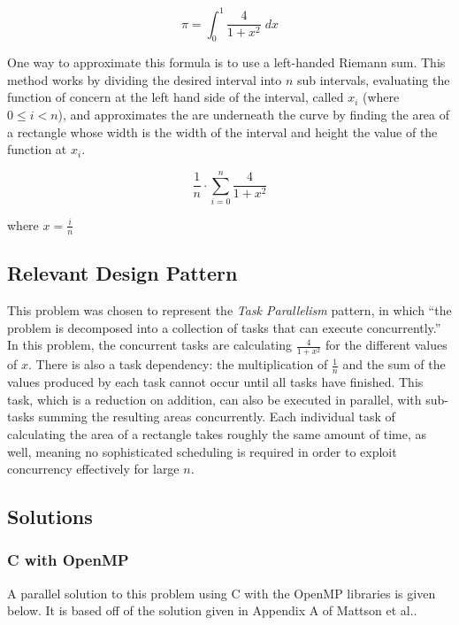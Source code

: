 \[\pi = \int_0^1 \frac{4}{1 + x^2} \; dx\]

One way to approximate this formula is to use a left-handed Riemann sum. 
This method works by dividing the desired interval into $n$ sub intervals, 
evaluating the function of concern at the left hand side of the interval, called $x_i$ (where $0 \le i < n$), 
and approximates the are underneath the curve by finding the area of a rectangle 
whose width is the width of the interval and height the value of the function at $x_i$.

\[\frac{1}{n} \cdot \sum_{i=0}^n \frac{4}{1 + x^2} \]

where $x = \frac{i}{n}$

\subsection{Relevant Design Pattern}
This problem was chosen to represent the \textit{Task Parallelism} pattern, 
in which ``the problem is decomposed into a collection of tasks that can execute concurrently.'' \cite{mass}
In this problem, the concurrent tasks are calculating $\frac{4}{1 + x^2}$ for the different values of $x$. 
There is also a task dependency: the multiplication of $\frac{1}{n}$ and the sum of the values produced by each task 
cannot occur until all tasks have finished. 
This task, which is a reduction on addition, can also be executed in parallel, 
with sub-tasks summing the resulting areas concurrently.
Each individual task of calculating the area of a rectangle takes roughly the same amount of time, as well, 
meaning no sophisticated scheduling is required in order to exploit concurrency effectively for large $n$.

\subsection{Solutions}
\subsubsection{C with OpenMP}
A parallel solution to this problem using C with the OpenMP libraries is given below. 
It is based off of the solution given in Appendix A of Mattson et al.\cite{mass}.

\begin{singlespacing}
\begin{small}

\end{small}
\end{singlespacing}

